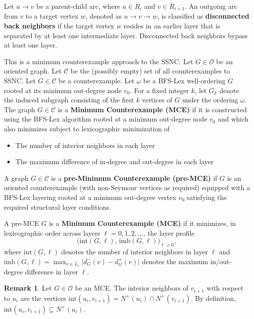 \documentclass[AMS, Times1COL]{article} %
\theoremstyle{definition}
\newtheorem{remark}{Remark}[section]
\begin{document}
	Let $u \to v$ be a parent-child arc, where $u \in R_i$ and $v \in R_{i+1}$. An outgoing arc from $v$ to a target vertex $w$, denoted as $u \to v \to w$, is classified as \textbf{disconnected back neighbors} if the target vertex $w$ resides in an earlier layer that is separated by at least one intermediate layer. Disconnected back neighbors bypass at least one layer. \label{disc_back_def}
	
	This is a minimum counterexample approach to the SSNC. 
	Let $G \in \mathcal{O}$ be an oriented graph. 
	Let $\mathcal{C}$ be the (possibly empty) set of all counterexamples to SSNC. 
	Let $G \in \mathcal{C}$ be a counterexample. 
	Let $\omega$ be a BFS-Lex well-ordering $G$ rooted at its minimum out-degree node $v_0$. 
	For a fixed integer $k$, let $G_k$ denote the induced subgraph consisting of the first $k$ vertices of $G$ under the ordering $\omega$. 
	The graph $G \in \mathcal{C}$ is a \textbf{Minimum Counterexample (MCE)} if it is constructed using the BFS-Lex algorithm rooted at a minimum out-degree node $v_0$ and which also minimizes subject to lexicographic minimization of
	
	\begin{itemize}
		\item The number of interior neighbors in each layer
		\item The maximum difference of in-degree and out-degree in each layer
	\end{itemize}
	
	A graph $G \in \mathcal{C}$ is a \textbf{pre-Minimum Counterexample (pre-MCE)} if $G$ is an oriented counterexample (with non-Seymour vertices as required) equipped with a BFS-Lex layering rooted at a minimum out-degree vertex $v_0$ satisfying the required structural layer conditions.
	
	A pre-MCE $G$ is a \textbf{Minimum Counterexample (MCE)} if it minimizes, in lexicographic order across layers $\ell = 0, 1, 2, \dots$, the layer profile
	\[
	\bigl(\mathrm{int}(G, \ell),\, \mathrm{imb}(G, \ell)\bigr)_{\ell \ge 0},
	\]
	where $\mathrm{int}(G, \ell)$ denotes the number of interior neighbors in layer $\ell$ and $\mathrm{imb}(G, \ell) = \max_{v \in L_\ell} \bigl|d_G^-(v) - d_G^+(v)\bigr|$ denotes the maximum in/out-degree difference in layer $\ell$.
	
	\begin{remark}
		Let $G\in \mathcal{O}$ be an MCE. The interior neighbors of $v_{i+1}$ with respect to $u_i$ are the vertices $\text{int}(u_i, v_{i+1}) = N^+(u_i) \cap N^+(v_{i+1})$. By definition, $\text{int}(u_i, v_{i+1}) \subseteq N^+(u_i)$. 
	\end{remark}
	
\end{document}
